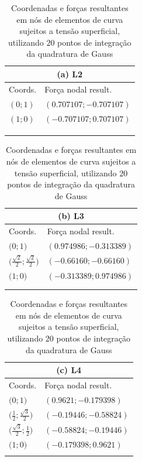 \documentclass[Tese.tex]{subfiles}
\begin{document}
\begin{table}[!htb]
	\centering
	\caption{Coordenadas e forças resultantes em nós de elementos de curva sujeitos a tensão superficial, utilizando $20$ pontos de integração da quadratura de Gauss}
	\scriptsize
	\label{tab:SurfaceTensionTest-nodes-1}
	{\def\arraystretch{2}
		\begin{tabular}{ll}
			\multicolumn{2}{c}{(a) L2} \\ \hline
			Coords. & Força nodal result. \\ \hline
			$\left( 0; 1 \right)$ & $\left( 0.707107; -0.707107 \right)$ \\
			$\left( 1; 0 \right)$ & $\left( -0.707107; 0.707107 \right)$ \\ \hline
			& \\
			& \\
			& \\[0.25cm]
		\end{tabular}\;
		\begin{tabular}{ll}
			\multicolumn{2}{c}{(b) L3} \\ \hline
			Coords. & Força nodal result. \\ \hline
			$\Big( 0; 1 \Big)$ & $\left( 0.974986; -0.313389 \right)$ \\
			$\Big( \frac{\sqrt{2}}{2}; \frac{\sqrt{2}}{2} \Big)$ & $\left( -0.66160; -0.66160 \right)$ \\
			$\Big( 1; 0 \Big)$ & $\left( -0.313389; 0.974986 \right)$ \\ \hline
			& \\
			& \\[0.17cm]
		\end{tabular}\;
		\begin{tabular}{ll}
			\multicolumn{2}{c}{(c) L4} \\ \hline
			Coords. & Força nodal result. \\ \hline
			$\Big( 0; 1 \Big)$ & $\left( 0.9621; -0.179398 \right)$ \\
			$\Big( \frac{1}{2}; \frac{\sqrt{3}}{2} \Big)$ & $\left( -0.19446; -0.58824 \right)$ \\
			$\Big( \frac{\sqrt{3}}{2}; \frac{1}{2} \Big)$ & $\left( -0.58824; -0.19446 \right)$ \\
			$\Big( 1; 0 \Big)$ & $\left( -0.179398; 0.9621 \right)$ \\ \hline
			& \\[0.15cm]
		\end{tabular}
	}
\end{table}
\end{document}
